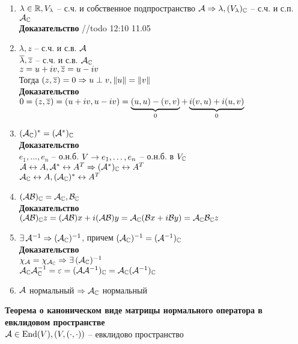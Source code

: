 \documentclass[12pt]{article}
\begin{document}
\begin{enumerate}
    \item $ \lambda \in \Rset, V_ \lambda$ -- с.ч. и собственное подпространство $\mcA \Rto \lambda, (V_ \lambda)_\Cset$ -- с.ч. и с.п. $\mcA_\Cset$\\
        \textbf{Доказательство}
        //todo 12:10 11.05
    \item $ \lambda, z$ -- с.ч. и с.в. $\mcA$\\
        $\ol \lambda, \ol z$ -- с.ч. и с.в. $\mcA_\Cset$\\
        $z = u + iv, \ol z = u - iv$\\
        Тогда $(z, \ol z) = 0 \Rto u \perp v, \|u\| = \|v\|$\\
        \textbf{Доказательство}\\
        $0 = (z, \ol z) = (u + iv, u - iv) = \ub 0{(u,u) - (v,v)} + \ub{0}{i(v,u) + i(u, v)}$
    \item $(\mcA_\Cset)^* = (\mcA^*)_\Cset$\\
        \textbf{Доказательство}\\
        $e_1, \ldots, e_n$ -- о.н.б. $V \rto e_1, \ldots, e_n$ -- о.н.б. в $V_\Cset$\\
        $\mcA \lrto A, \mcA^* \lrto A^T \Rto (\mcA^*)_\Cset \lrto A^T$\\
        $\mcA_\Cset \lrto A, (\mcA_\Cset)^* \lrto A^T$
    \item $(\mcA \mcB)_\Cset = \mcA_\Cset, \mcB_\Cset$\\
        \textbf{Доказательство}\\
        $(\mcA\mcB)_\Cset z = (\mcA\mcB) x + i (\mcA\mcB)y = \mcA_\Cset (\mcB x + i\mcB y) = \mcA_\Cset \mcB_\Cset z$\\
    \item $\ex \mcA^{-1} \Rto (\mcA_\Cset)^{-1}$, причем $(\mcA_\Cset)^{-1} = (\mcA^{-1})_\Cset$\\
        \textbf{Доказательство}\\
        $\chi_\mcA = \chi_{\mcA_\Cset} \Rto \ex (\mcA_\Cset)^{-1}$\\
        $\mcA_\Cset \mcA_\Cset^{-1} = \eps = (\mcA \mcA^{-1})_\Cset = \mcA_\Cset (\mcA^{-1})_\Cset$
    \item $\mcA$ нормальный $\Rto \mcA_\Cset$ нормальный
\end{enumerate}
\textbf{Теорема о каноническом виде матрицы нормального оператора в евклидовом пространстве}\\
$\mcA \in \nm{End}(V), (V, (\cdot, \cdot))$ -- евклидово пространство\\
\end{document}
